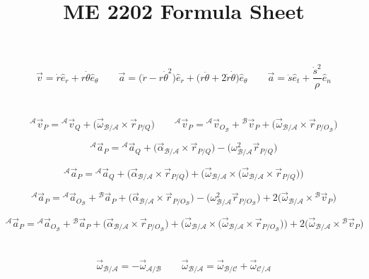 \documentclass{article}
\title{ME 2202 Formula Sheet}
\author{\vspace{-5ex}}
\date{\vspace{-5ex}}
\begin{document}
\maketitle

\section*{}
\[
\vec v=\dot r\hat e_r+r\dot\theta\hat e_\theta \qquad
\vec a=\bigl(\ddot r-r\dot\theta^2\bigr)\hat e_r+\bigl(r\ddot\theta+2\dot r\dot\theta\bigr)\hat e_\theta \qquad
\vec a=\ddot s\hat e_t+\frac{\dot s^2}{\rho}\hat e_n
\]

\section*{}
\[
{}^\mathcal A\vec v_P={}^\mathcal A\vec v_Q+\bigl(\vec\omega_{\mathcal B/\mathcal A}\times\vec r_{P/Q}\bigr) \qquad
{}^\mathcal A\vec v_P={}^\mathcal A\vec v_{O_\mathcal B}+{}^\mathcal B\vec v_P+\bigl(\vec\omega_{\mathcal B/\mathcal A}\times\vec r_{P/O_\mathcal B}\bigr)
\]

\[
{}^\mathcal A\vec a_P={}^\mathcal A\vec a_Q+\bigl(\vec\alpha_{\mathcal B/\mathcal A}\times\vec r_{P/Q}\bigr)-\bigl(\omega_{\mathcal B/\mathcal A}^2\vec r_{P/Q}\bigr)
\]

\[
{}^\mathcal A\vec a_P={}^\mathcal A\vec a_Q+\bigl(\vec\alpha_{\mathcal B/\mathcal A}\times\vec r_{P/Q}\bigr)+\bigl(\vec\omega_{\mathcal B/\mathcal A}\times\bigl(\vec\omega_{\mathcal B/\mathcal A}\times\vec r_{P/Q}\bigr)\bigr)
\]

\[
{}^\mathcal A\vec a_P={}^\mathcal A\vec a_{O_\mathcal B}+{}^\mathcal B\vec a_P+\bigl(\vec\alpha_{\mathcal B/\mathcal A}\times\vec r_{P/O_\mathcal B}\bigr)-\bigl(\omega_{\mathcal B/\mathcal A}^2\vec r_{P/O_\mathcal B}\bigr)+2\bigl(\vec\omega_{\mathcal B/\mathcal A}\times{}^\mathcal B\vec v_P\bigr)
\]

\[
{}^\mathcal A\vec a_P={}^\mathcal A\vec a_{O_\mathcal B}+{}^\mathcal B\vec a_P+\bigl(\vec\alpha_{\mathcal B/\mathcal A}\times\vec r_{P/O_\mathcal B}\bigr)+\bigl(\vec\omega_{\mathcal B/\mathcal A}\times\bigl(\vec\omega_{\mathcal B/\mathcal A}\times\vec r_{P/O_\mathcal B}\bigr)\bigr)+2\bigl(\vec\omega_{\mathcal B/\mathcal A}\times{}^\mathcal B\vec v_P\bigr)
\]

\section*{}
\[
\vec\omega_{\mathcal B/\mathcal A}=-\vec\omega_{\mathcal A/\mathcal B} \qquad
\vec\omega_{\mathcal B/\mathcal A}=\vec\omega_{\mathcal B/\mathcal C}+\vec\omega_{\mathcal C/\mathcal A}
\]
\end{document}
